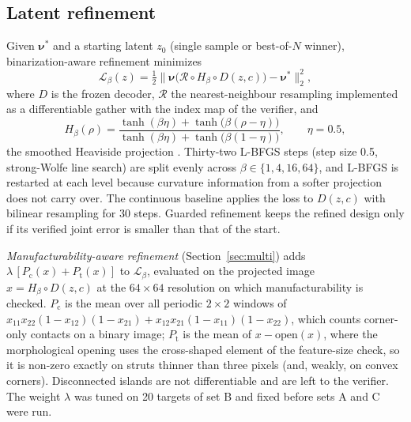 \documentclass[a4paper,11pt]{article}
\begin{document}
\subsection{Latent refinement}
Given $\boldsymbol\nu^{*}$ and a starting latent $z_0$ (single sample or
best-of-$N$ winner), binarization-aware refinement minimizes
\begin{equation}
\mathcal L_\beta(z)=\tfrac12\bigl\lVert
\boldsymbol\nu\bigl(\mathcal R\circ H_\beta\circ D(z,c)\bigr)
-\boldsymbol\nu^{*}\bigr\rVert_2^2 ,
\end{equation}
where $D$ is the frozen decoder, $\mathcal R$ the nearest-neighbour
resampling implemented as a differentiable gather with the index map of the
verifier, and
\begin{equation}
H_\beta(\rho)=\frac{\tanh(\beta\eta)+\tanh\bigl(\beta(\rho-\eta)\bigr)}
{\tanh(\beta\eta)+\tanh\bigl(\beta(1-\eta)\bigr)},\qquad \eta=0.5,
\end{equation}
the smoothed Heaviside projection \citep{wang2011projection}. Thirty-two
L-BFGS steps \citep{liu1989lbfgs} (step size 0.5, strong-Wolfe line search)
are split evenly across $\beta\in\{1,4,16,64\}$, and L-BFGS is restarted at
each level because curvature information from a softer projection does not
carry over. The continuous baseline applies the loss to $D(z,c)$ with
bilinear resampling for 30 steps. Guarded refinement keeps the refined
design only if its verified joint error is smaller than that of the start.

\emph{Manufacturability-aware refinement} (Section~\ref{sec:multi}) adds
$\lambda\,[P_{\mathrm{c}}(x)+P_{\mathrm{t}}(x)]$ to $\mathcal L_\beta$,
evaluated on the projected image $x=H_\beta\circ D(z,c)$ at the
$64\times64$ resolution on which manufacturability is checked.
$P_{\mathrm{c}}$ is the mean over all periodic $2\times2$ windows of
$x_{11}x_{22}(1-x_{12})(1-x_{21})+x_{12}x_{21}(1-x_{11})(1-x_{22})$, which
counts corner-only contacts on a binary image; $P_{\mathrm{t}}$ is the mean
of $x-\mathrm{open}(x)$, where the morphological opening uses the
cross-shaped element of the feature-size check, so it is non-zero exactly on
struts thinner than three pixels (and, weakly, on convex corners).
Disconnected islands are not differentiable and are left to the verifier.
The weight $\lambda$ was tuned on 20 targets of set B and fixed before
sets A and C were run.
\end{document}
